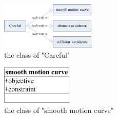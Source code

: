 \documentclass[12pt]{article}
\begin{document}
\begin{figure}[htbp]
\centering
\includegraphics[width=0.4\textwidth]{./class1}
\caption{the class of "Careful"}
\label{fig:class1}
\end{figure}

\begin{figure}[htbp]
\centering
\includegraphics[width=0.3\textwidth]{./class2}
\caption{the class of "smooth motion curve"}
\label{fig:class2}
\end{figure}




\end{document}

